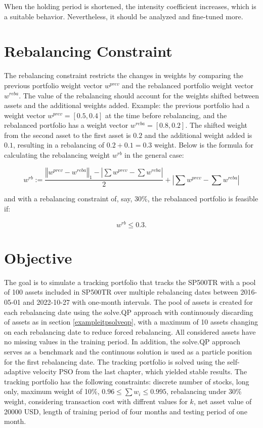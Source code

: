 \documentclass[
  oneside, a4paper, 12pt, openany]{book}
\theoremstyle{definition}
\theoremstyle{definition}
\theoremstyle{definition}
\theoremstyle{definition}
\theoremstyle{remark}
\begin{document}
When the holding period is shortened, the intensity coefficient increases, which is a suitable behavior. Nevertheless, it should be analyzed and fine-tuned more.

\hypertarget{rebalancing-constraint}{%
\section{Rebalancing Constraint}\label{rebalancing-constraint}}

The rebalancing constraint restricts the changes in weights by comparing the previous portfolio weight vector \(w^{prev}\) and the rebalanced portfolio weight vector \(w^{reba}\). The value of the rebalancing should account for the weights shifted between assets and the additional weights added. Example: the previous portfolio had a weight vector \(w^{prev} = [0.5, 0.4]\) at the time before rebalancing, and the rebalanced portfolio has a weight vector \(w^{reba} = [0.8, 0.2]\). The shifted weight from the second asset to the first asset is \(0.2\) and the additional weight added is \(0.1\), resulting in a rebalancing of \(0.2+0.1=0.3\) weight. Below is the formula for calculating the rebalancing weight \(w^{rb}\) in the general case:

\[
  w^{rb} := \frac{\left\Vert w^{prev}-w^{reba} \right\Vert_1 - |\sum w^{prev} - \sum w^{reba}|}{2}+|\sum w^{prev} - \sum w^{reba}|
\]

and with a rebalancing constraint of, say, 30\%, the rebalanced portfolio is feasible if:

\[
  w^{rb} \leq 0.3.
\]

\hypertarget{objective}{%
\section{Objective}\label{objective}}

The goal is to simulate a tracking portfolio that tracks the SP500TR with a pool of 100 assets included in SP500TR over multiple rebalancing dates between 2016-05-01 and 2022-10-27 with one-month intervals. The pool of assets is created for each rebalancing date using the solve.QP approach with continuously discarding of assets as in section \ref{exampleitpsolveqp}, with a maximum of 10 assets changing on each rebalancing date to reduce forced rebalancing. All considered assets have no missing values in the training period. In addition, the solve.QP approach serves as a benchmark and the continuous solution is used as a particle position for the first rebalancing date. The tracking portfolio is solved using the self-adaptive velocity PSO from the last chapter, which yielded stable results. The tracking portfolio has the following constraints: discrete number of stocks, long only, maximum weight of 10\%, \(0.96 \leq \sum w_i \leq 0.995\), rebalancing under 30\% weight, considering transaction cost with diffrent values for \(k\), net asset value of 20000 USD, length of training period of four months and testing period of one month.
\end{document}
